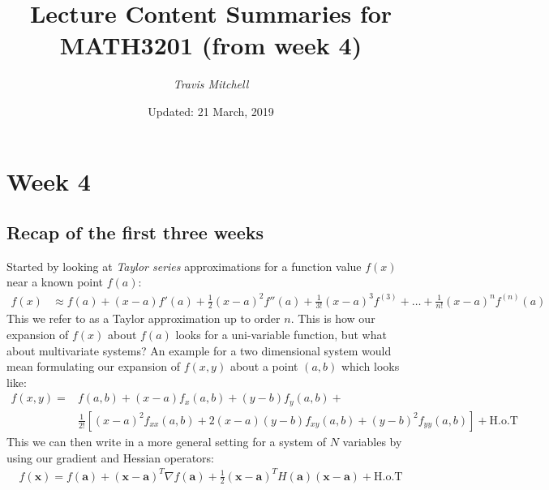 \documentclass[11pt,a4paper]{report}
\author{\textit{Travis Mitchell}}
\title{Lecture Content Summaries for MATH3201 (from week 4)}
\date{Updated: 21 March, 2019}
\begin{document}
\maketitle
\clearpage

\section{Week 4}
	\subsection{Recap of the first three weeks}
		Started by looking at \textit{Taylor series} approximations for a function value $f(x)$ near a known point $f(a)$:
		\begin{align}
			f(x) &\approx f(a) + (x-a) f'(a) + \frac{1}{2} (x-a)^2 f''(a) + \frac{1}{3!} (x-a)^3 f^{(3)} + \dots + \frac{1}{n!} (x-a)^n f^{(n)}(a)
		\end{align}
		This we refer to as a Taylor approximation up to order $n$. This is how our expansion of $f(x)$ about $f(a)$ looks for a uni-variable function, but what about multivariate systems? An example for a two dimensional system would mean formulating our expansion of $f(x,y)$ about a point $(a,b)$ which looks like:
		\begin{align}
			f(x,y) = &f(a,b) + (x-a)f_x(a,b) + (y-b)f_y(a,b) + \nonumber \\ 
			&\frac{1}{2!} \left[ (x-a)^2 f_{xx}(a,b) + 2(x-a)(y-b)f_{xy}(a,b) + (y-b)^2 f_{yy}(a,b)\right] + \text{H.o.T}
		\end{align} 
		This we can then write in a more general setting for a system of $N$ variables by using our gradient and Hessian operators:
\newcommand{\ba}{\mathbf{a}}		\newcommand{\bx}{\mathbf{x}}
		\begin{align}
			f(\bx) = f(\ba) + (\bx - \ba)^T \nabla f(\ba) + \frac{1}{2} (\bx - \ba)^T H(\ba) (\bx - \ba) + \text{H.o.T}
		\end{align}
		
\end{document}
